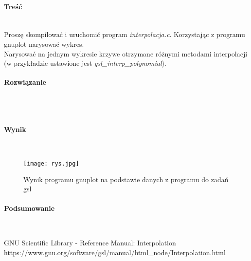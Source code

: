 \paragraph{Treść} ~\\
Proszę skompilować i uruchomić program \textit{interpolacja.c}.
Korzystając z programu gnuplot narysować wykres. \\
Narysować na jednym wykresie krzywe otrzymane różnymi metodami interpolacji (w przykładzie ustawione jest \textit{gsl\_interp\_polynomial})\nocite{GslManualInterpolation}.

\paragraph{Rozwiązanie} ~\\
 ~\\

\paragraph{Wynik} ~\\
\begin{figure}[h]
  \centering
  \texttt{[image: rys.jpg]}
  \caption{Wynik programu gnuplot na podstawie danych z programu do zadań gsl}
  \label{fig:WynikProgramuGnuplotNaPodstawieDanychZProgramuDoZadanGsl}
\end{figure}

\paragraph{Podsumowanie} ~\\

\begin{thebibliography}{9}
   GNU Scientific Library - Reference Manual: Interpolation https://www.gnu.org/software/gsl/manual/html\_node/Interpolation.html
\end{thebibliography}
